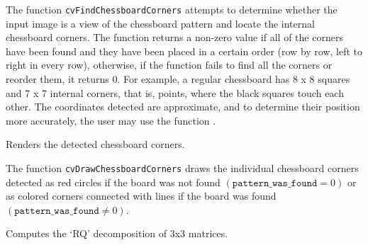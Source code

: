 The function \texttt{cvFindChessboardCorners} attempts to determine
whether the input image is a view of the chessboard pattern and
locate the internal chessboard corners. The function returns a non-zero
value if all of the corners have been found and they have been placed
in a certain order (row by row, left to right in every row),
otherwise, if the function fails to find all the corners or reorder
them, it returns 0. For example, a regular chessboard has 8 x 8
squares and 7 x 7 internal corners, that is, points, where the black
squares touch each other. The coordinates detected are approximate,
and to determine their position more accurately, the user may use
the function .

\label{DrawChessBoardCorners}

Renders the detected chessboard corners.


\begin{description}
\end{description}

The function \texttt{cvDrawChessboardCorners} draws the individual chessboard corners detected as red circles if the board was not found $(\texttt{pattern\_was\_found} =0)$ or as colored corners connected with lines if the board was found $(\texttt{pattern\_was\_found} \ne 0)$.


\label{RQDecomp3x3}

Computes the `RQ' decomposition of 3x3 matrices.


